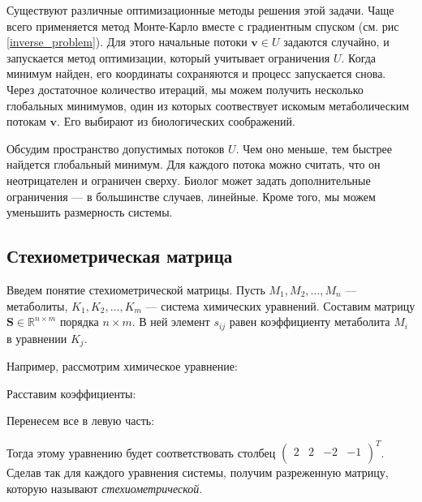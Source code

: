 \documentclass[14pt, a4paper]{extreport}
\begin{document}
Существуют различные оптимизационные методы решения этой задачи. Чаще всего применяется метод Монте-Карло вместе с градиентным спуском (см. рис \ref{inverse_problem}). Для этого начальные потоки $\boldsymbol{v} \in U$ задаются случайно, и запускается метод оптимизации, который учитывает ограничения $U$. Когда минимум найден, его координаты сохраняются и процесс запускается снова. Через достаточное количество итераций, мы можем получить несколько глобальных минимумов, один из которых соотвествует искомым метаболическим потокам $\boldsymbol{v}$. Его выбирают из биологических соображений.

Обсудим пространство допустимых потоков $U$. Чем оно меньше, тем быстрее найдется глобальный минимум. Для каждого потока можно считать, что он неотрицателен и ограничен сверху. Биолог может задать дополнительные ограничения --- в большинстве случаев, линейные. Кроме того, мы можем уменьшить размерность системы.

\subsection{Стехиометрическая матрица}

Введем понятие стехиометрической матрицы. Пусть $M_1, M_2, \dots, M_n$ --- метаболиты, $K_1, K_2, \dots, K_m$ --- система химических уравнений. 
Составим матрицу $\boldsymbol{S} \in \mathbb{R}^{n \times m}$ порядка $n \times m$. В ней элемент $s_{ij}$ равен коэффициенту метаболита $M_i$ в уравнении $K_j$.

Например, рассмотрим химическое уравнение:

\begin{center}
\end{center}

Расставим коэффициенты:

\begin{center}
\end{center}

Перенесем все в левую часть:

\begin{center}
\end{center}
Тогда этому уравнению будет соответствовать столбец $\begin{pmatrix}
2 & 2 & -2 & -1\\
\end{pmatrix}^T$. Сделав так для каждого уравнения системы, получим разреженную матрицу, которую называют \emph{стехиометрической}.
\end{document}
